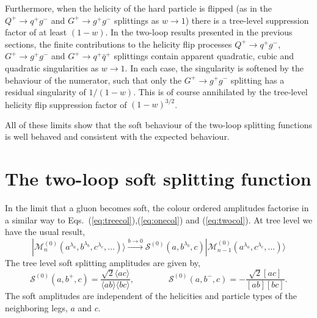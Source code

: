 \documentclass[paper,notoc,nohyper]{JHEP3}
\newcommand{\la}{\langle}
\newcommand{\ra}{\rangle}
\def\ket#1{|{#1}\rangle}
\begin{document}
Furthermore, when the helicity of the hard particle is flipped (as in the $Q^+ \to q^+ g^-$ and $G^+ \to g^+ g^-$ splittings as $w \to 1$) 
there is a tree-level suppression factor of at least $(1-w)$.   
In the two-loop results presented in the previous sections, the
finite contributions to the helicity flip processes $Q^+ \to q^+ g^-$, $G^+ \to g^+ g^-$ and $G^+ \to q^+\bar q^+$ splittings contain apparent quadratic, cubic and quadratic
singularities 
as $w \to 1$.  In each case, the singularity is softened by the behaviour of the numerator, such that only the 
  $G^+ \to g^+ g^-$ splitting has a residual singularity of $1/(1-w)$. 
  This is of course annihilated by the tree-level helicity flip suppression factor of $(1-w)^{3/2}$.
    

All of these limits show that the soft behaviour of the two-loop splitting functions is well behaved and 
consistent with the expected behaviour.


\section{The two-loop soft splitting function}
\label{sec:soft}


In the limit that a gluon becomes soft,
the colour ordered amplitudes factorise in a similar way to 
Eqs.~(\ref{eq:treecol}),(\ref{eq:onecol}) and (\ref{eq:twocol}).
At tree level we have the usual result,
\begin{equation}
\ket{\mathcal{M}^{(0)}_n(a^{\lambda_a},b^{\lambda_b},c^{\lambda_c},\ldots)} 
\stackrel{{b\rightarrow 0}}{\longrightarrow} 
\mathcal{S}^{(0)}(a,b^{\lambda_{b}},c)
\ket{\mathcal{M}^{(0)}_{n-1}(a^{\lambda_a},c^{\lambda_c},\ldots)}
\end{equation}
The tree level soft splitting amplitudes are given by,
\begin{equation}
\mathcal{S}^{(0)}(a,b^+,c) = \frac{\sqrt{2}\la ac \ra}{\la ab \ra \la bc \ra} ,
\qquad \qquad \mathcal{S}^{(0)}(a,b^-,c) = -\frac{\sqrt{2}[ac]}{[ab][bc]}. 
\end{equation}
The soft amplitudes are independent of the helicities and particle types of the neighboring
legs, $a$ and $c$.
\end{document}

